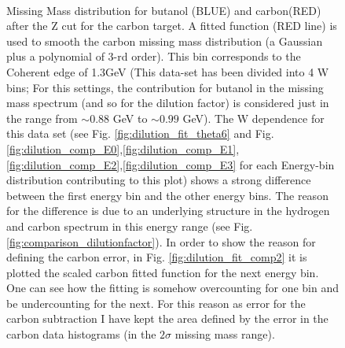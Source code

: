 \begin{figure}[H]
  \begin{center}
     \\
    \caption{Missing Mass distribution for butanol (BLUE) and carbon(RED) after the Z cut for the carbon target. A fitted function (RED line)  is used to smooth the carbon missing mass distribution (a Gaussian plus a polynomial of 3-rd order). This bin corresponds to the Coherent edge of 1.3GeV (This data-set has been divided into 4 W bins; For this settings, the contribution for butanol in the missing mass spectrum (and so for the dilution factor) is considered just in the range from $\sim 0.88$ GeV to $\sim 0.99$ GeV). The W dependence for this data set (see Fig. \ref{fig:dilution_fit_theta6} and Fig. \ref{fig:dilution_comp_E0},\ref{fig:dilution_comp_E1},\ref{fig:dilution_comp_E2},\ref{fig:dilution_comp_E3} for each Energy-bin distribution contributing to this plot) shows a strong difference between the first energy bin and the other energy bins. The reason for the difference is due to an underlying structure in the hydrogen and carbon spectrum in this energy range (see Fig. \ref{fig:comparison_dilutionfactor}). In order to show the reason for defining the carbon error, in Fig. \ref{fig:dilution_fit_comp2} it is plotted the scaled carbon fitted function for the next energy bin. One can see how the fitting is somehow overcounting for one bin and be undercounting for the next. For this reason as error for the carbon subtraction I have kept the area defined by the error in the carbon data histograms (in the $2\sigma$ missing mass range). }
    \label{fig:dilution_fit_comp}
  \end{center}
\end{figure}

